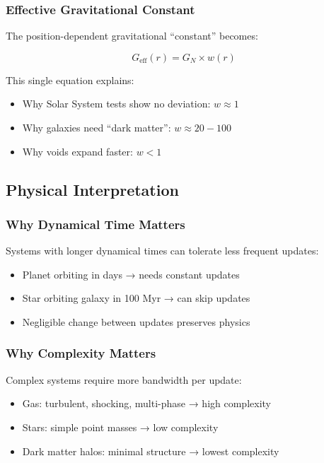 \documentclass[12pt,letterpaper]{article}
\newcommand{\geff}{G_{\text{eff}}}
\newcommand{\gnewton}{G_N}
\begin{document}
\subsubsection{Effective Gravitational Constant}

The position-dependent gravitational ``constant'' becomes:

\begin{equation}
\boxed{\geff(r) = \gnewton \times w(r)}
\end{equation}

This single equation explains:
\begin{itemize}
    \item Why Solar System tests show no deviation: $w \approx 1$
    \item Why galaxies need ``dark matter'': $w \approx 20-100$  
    \item Why voids expand faster: $w < 1$
\end{itemize}

\subsection{Physical Interpretation}

\subsubsection{Why Dynamical Time Matters}

Systems with longer dynamical times can tolerate less frequent updates:
\begin{itemize}
    \item Planet orbiting in days → needs constant updates
    \item Star orbiting galaxy in 100 Myr → can skip updates
    \item Negligible change between updates preserves physics
\end{itemize}

\subsubsection{Why Complexity Matters}

Complex systems require more bandwidth per update:
\begin{itemize}
    \item Gas: turbulent, shocking, multi-phase → high complexity
    \item Stars: simple point masses → low complexity
    \item Dark matter halos: minimal structure → lowest complexity
\end{itemize}
\end{document}
